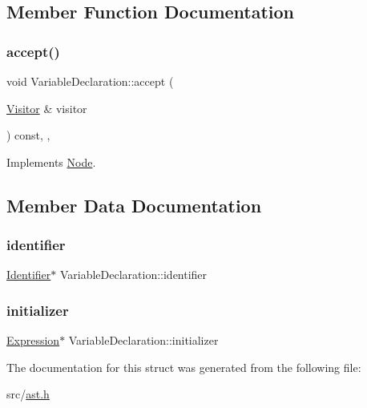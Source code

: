 \subsection{Member Function Documentation}
\mbox{\label{struct_variable_declaration_abdf0b5eed5200357de1bd9bf5ce6f6b3}} 
\subsubsection{\texorpdfstring{accept()}{accept()}}
{\footnotesize\ttfamily void Variable\+Declaration\+::accept (\begin{DoxyParamCaption}\item[{\hyperlink{struct_visitor}{Visitor} \&}]{visitor }\end{DoxyParamCaption}) const\hspace{0.3cm}{\ttfamily [inline]}, {\ttfamily [override]}, {\ttfamily [virtual]}}



Implements \hyperlink{struct_node_a10bd7af968140bbf5fa461298a969c71}{Node}.



\subsection{Member Data Documentation}
\mbox{\label{struct_variable_declaration_af00ca23e243d1ab865fd094c9be7a5c9}} 
\subsubsection{\texorpdfstring{identifier}{identifier}}
{\footnotesize\ttfamily \hyperlink{struct_identifier}{Identifier}$\ast$ Variable\+Declaration\+::identifier}

\mbox{\label{struct_variable_declaration_a472faa13a27b5cc06125787259116a2f}} 
\subsubsection{\texorpdfstring{initializer}{initializer}}
{\footnotesize\ttfamily \hyperlink{struct_expression}{Expression}$\ast$ Variable\+Declaration\+::initializer}



The documentation for this struct was generated from the following file\+:\begin{DoxyCompactItemize}
\item 
src/\hyperlink{ast_8h}{ast.\+h}\end{DoxyCompactItemize}
